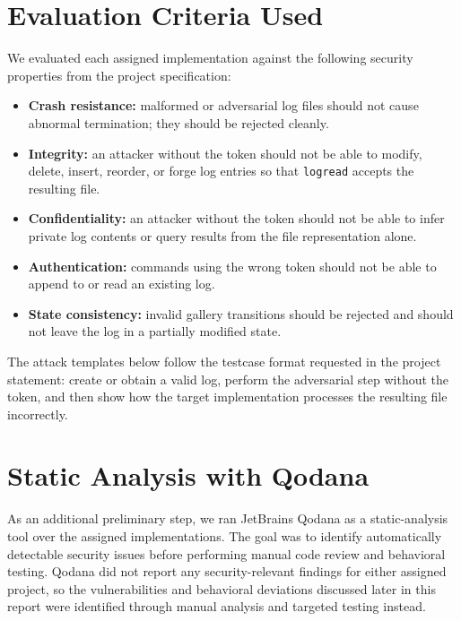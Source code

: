 \documentclass[a4paper, 12pt]{article}
\begin{document}
    \section{Evaluation Criteria Used}
    We evaluated each assigned implementation against the following security properties from the project specification:
    \begin{itemize}
        \item \textbf{Crash resistance:} malformed or adversarial log files should not cause abnormal termination; they should be rejected cleanly.
        \item \textbf{Integrity:} an attacker without the token should not be able to modify, delete, insert, reorder, or forge log entries so that \texttt{logread} accepts the resulting file.
        \item \textbf{Confidentiality:} an attacker without the token should not be able to infer private log contents or query results from the file representation alone.
        \item \textbf{Authentication:} commands using the wrong token should not be able to append to or read an existing log.
        \item \textbf{State consistency:} invalid gallery transitions should be rejected and should not leave the log in a partially modified state.
    \end{itemize}

    The attack templates below follow the testcase format requested in the project statement: create or obtain a valid log, perform the adversarial step without the token, and then show how the target implementation processes the resulting file incorrectly.

    \section{Static Analysis with Qodana}
    As an additional preliminary step, we ran JetBrains Qodana as a static-analysis tool over the assigned implementations. The goal was to identify automatically detectable security issues before performing manual code review and behavioral testing. Qodana did not report any security-relevant findings for either assigned project, so the vulnerabilities and behavioral deviations discussed later in this report were identified through manual analysis and targeted testing instead.
\end{document}
